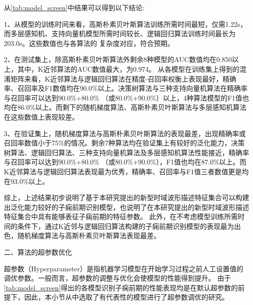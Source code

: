 从\autoref{tab:model_screen}中结果可以得到以下结论:

1、从模型的训练时间来看，高斯朴素贝叶斯算法训练所需时间最短，仅需1.22s，而多层感知机、支持向量机模型所需时间较长、逻辑回归算法训练时间最长为203.0s。这些数值也与各算法的
复杂度对应，符合预期。

2、在测试集上，除高斯朴素贝叶斯算法外剩余8种模型的AUC数值均在0.850以上，其中，K近邻算法的AUC数值最大，为0.974。
从各模型在训练集上得到的混淆矩阵来看，K近邻算法与逻辑回归算法在精度-召回率权衡上表现最好，精确率、召回率及F1数值均在90.0\%以上。决策树算法与三种支持向量机算法在精确率与召回率可以达到90.0\%+80.0\%
（或80.0\%+90.0\%）以上，4种算法模型的F1值也均在86.0\%以上。而剩下的随机梯度算法、高斯朴素贝叶斯算法与多层感知机算法在这些数值上表现较差。

3、在验证集上，随机梯度算法与高斯朴素贝叶斯算法的表现最差，出现精确率或召回率数值小于75\%的情况。剩余7种算法均在验证集上有较好的泛化能力，决策树算法、逻辑回归算法、三种支持向量机算法及多层感知机算法性能接近，精确率与召回率可以达到90.0\%+80.0\%
（或80.0\%+90.0\%），F1值也均在87.0\%以上。而K近邻算法与逻辑回归算法表现最为优秀，精确率、召回率与F1值三者数值更是均在93.0\%以上。

综上，上述结果初步说明了基于本研究提出的新型时域波形描述特征集合可以构建出泛化能力较好的子痫前期识别模型，也说明了在本研究提出的新型时域波形描述特征集合中具有能够表征子痫前期的特征参数。
此外，在不考虑模型训练所需时间的条件下，通过K近邻与逻辑回归算法构建的子痫前期识别模型的表现最为出色，随机梯度算法与高斯朴素贝叶斯算法表现最差。

二、算法的超参数优化

超参数（Hyperparameter）是指机器学习模型在开始学习过程之前人工设置值的调优参数。一般而言，超参数的调整与优化会使模型的性能得到提升。
由于\autoref{tab:model_screen}得出的各模型识别子痫前期的性能表现均是在默认超参数的前提下，因此，本小节从中选取了有代表性的模型进行了超参数调优的研究。

